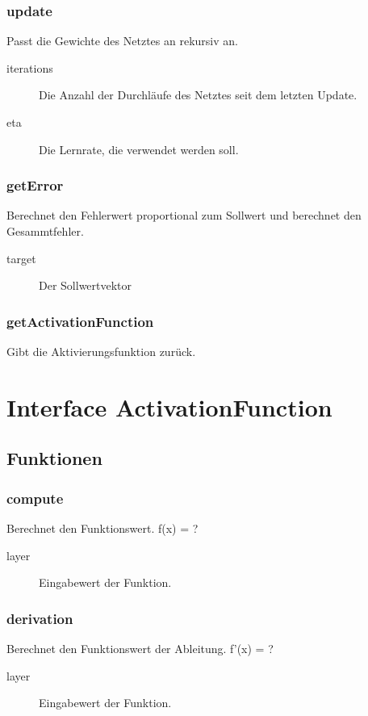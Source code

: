\documentclass[a4paper,10pt]{scrartcl}
\begin{document}
\subsubsection{update}
Passt die Gewichte des Netztes an rekursiv an.
\begin{description}
\item[iterations] Die Anzahl der Durchläufe des Netztes seit dem letzten Update.
\item[eta] Die Lernrate, die verwendet werden soll.
\end{description}

\subsubsection{getError}
Berechnet den Fehlerwert proportional zum Sollwert und berechnet den Gesammtfehler.
\begin{description}
\item[target] Der Sollwertvektor
\end{description}

\subsubsection{getActivationFunction}
Gibt die Aktivierungsfunktion zurück.



\section{Interface ActivationFunction}
\subsection{Funktionen}
\subsubsection{compute}
Berechnet den Funktionswert. f(x) = ?
\begin{description}
\item[layer] Eingabewert der Funktion.
\end{description}

\subsubsection{derivation}
Berechnet den Funktionswert der Ableitung. f'(x) = ?
\begin{description}
\item[layer] Eingabewert der Funktion.
\end{description}
\end{document}

